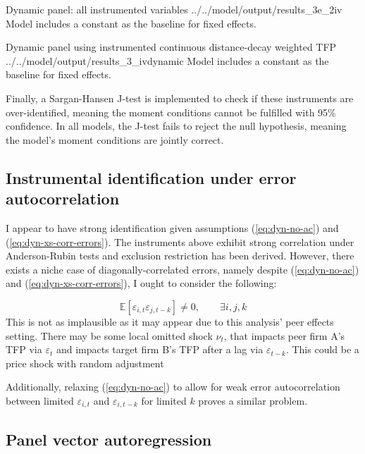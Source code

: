 \wraptable
    {Dynamic panel: all instrumented variables}
    {../../model/output/results_3e_2iv}
    {
        Model includes a constant as the baseline for  fixed effects.
    }

\wraptable
    {Dynamic panel using instrumented continuous distance-decay weighted TFP}
    {../../model/output/results_3_ivdynamic}
    {
        Model includes a constant as the baseline for  fixed effects.
    }

\par 
Finally, a Sargan-Hansen J-test is implemented to check if these instruments are 
over-identified, meaning the moment conditions cannot be fulfilled with 95\% confidence.
In all models, the J-test fails to reject the null hypothesis,
meaning the model's moment conditions are jointly correct.

\subsection{Instrumental identification under error autocorrelation}

I appear to have strong identification given assumptions (\ref{eq:dyn-no-ac}) and (\ref{eq:dyn-xs-corr-errors}).
The instruments above exhibit strong correlation under Anderson-Rubin tests and exclusion restriction has been derived.
However, there exists a niche case of diagonally-correlated errors,
namely despite (\ref{eq:dyn-no-ac}) and (\ref{eq:dyn-xs-corr-errors}),
I ought to consider the following:

\begin{equation}
    \mathbb E[\varepsilon_{i,t} \varepsilon_{j,t-k}]\neq 0,\qquad\exists i,j,k
\end{equation}
%
This is not as implausible as it may appear due to this analysis' peer effects setting. 
There may be some local omitted shock $\nu_t$,
that impacts peer firm A's TFP via $\varepsilon_t$
and impacts target firm B's TFP after a lag via $\varepsilon_{t-k}$.
This could be a price shock with random adjustment 
\par
Additionally, relaxing (\ref{eq:dyn-no-ac}) to allow for weak error autocorrelation
between limited $\varepsilon_{i,t}$ and $\varepsilon_{i,t-k}$ for limited $k$
proves a similar problem.
\par
{}

\subsection{Panel vector autoregression}


